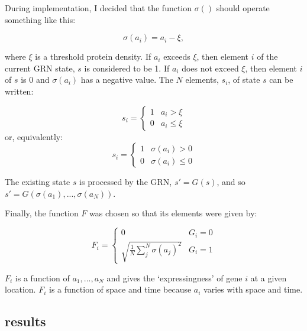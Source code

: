 \documentclass[11pt, a4paper]{article}
\begin{document}
During implementation, I decided that the function $\sigma()$ should
operate something like this:

\begin{equation} \label{eq:sigma}
\sigma(a_i) = a_i - \xi,
\end{equation}

where $\xi$ is a threshold protein density. If $a_i$ exceeds $\xi$, then
element $i$ of the current GRN state, $s$ is considered to be 1. If $a_i$ does
not exceed $\xi$, then element $i$ of $s$ is 0 and $\sigma(a_i)$ has a
negative value. The $N$ elements, $s_i$, of state $s$ can be written:

\begin{equation} \label{eq:s}
s_i = \begin{cases}
      1 & a_i > \xi \\
      0 & a_i \leq \xi
      \end{cases}
\end{equation}
or, equivalently:
\begin{equation} \label{eq:s2}
s_i = \begin{cases}
      1 & \sigma(a_i) > 0 \\
      0 & \sigma(a_i) \leq 0
      \end{cases}
\end{equation}

The existing state $s$ is processed by the GRN, $s' = G(s)$, and so $s' = G(\sigma(a_1),...,\sigma(a_N))$.

Finally, the function $F$ was chosen so that its elements were given by:

\begin{equation} \label{eq:F}
F_i = \begin{cases}
0 & G_i = 0 \\
\sqrt{\frac{1}{N}\sum_j^N \sigma(a_j)^2}  & G_i = 1
\end{cases}
\end{equation}

$F_i$ is a function of $a_1,...,a_N$ and gives the `expressingness' of gene
$i$ at a given location. $F_i$ is a function of space and time because $a_i$
varies with space and time.

\subsection{results}
\end{document}
